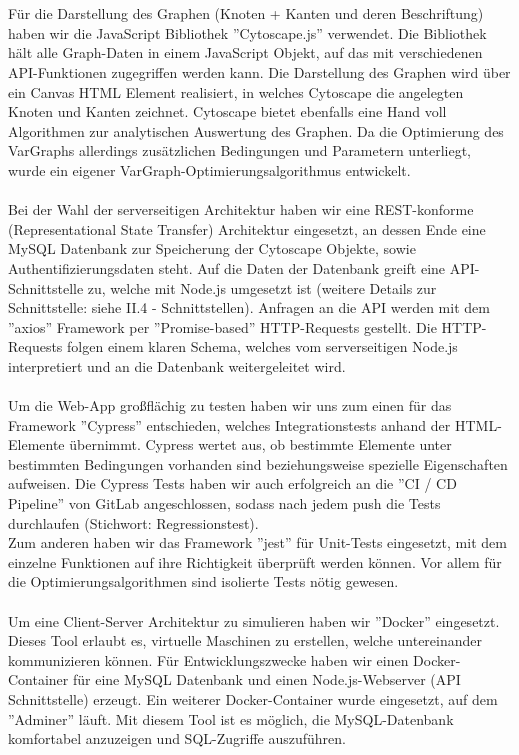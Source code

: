 \documentclass[twoside]{report}
\begin{document}
\\
\\Für die Darstellung des Graphen (Knoten + Kanten und deren Beschriftung) haben wir die JavaScript Bibliothek ''Cytoscape.js'' verwendet.
Die Bibliothek hält alle Graph-Daten in einem JavaScript Objekt, auf das mit verschiedenen API-Funktionen zugegriffen werden kann.
Die Darstellung des Graphen wird über ein Canvas HTML Element realisiert, in welches Cytoscape die angelegten Knoten und Kanten zeichnet.
Cytoscape bietet ebenfalls eine Hand voll Algorithmen zur analytischen Auswertung des Graphen. Da die Optimierung des VarGraphs
allerdings zusätzlichen Bedingungen und Parametern unterliegt, wurde ein eigener VarGraph-Optimierungsalgorithmus entwickelt.
\\
\\Bei der Wahl der serverseitigen Architektur haben wir eine REST-konforme (Representational State Transfer)
Architektur eingesetzt, an dessen Ende eine MySQL Datenbank zur Speicherung der Cytoscape Objekte, sowie Authentifizierungsdaten
steht. Auf die Daten der Datenbank greift eine API-Schnittstelle zu, welche mit Node.js umgesetzt ist (weitere Details zur Schnittstelle:
siehe II.4 - Schnittstellen). Anfragen an die API werden mit dem ''axios'' Framework per ''Promise-based'' HTTP-Requests gestellt. Die HTTP-Requests
folgen einem klaren Schema, welches vom serverseitigen Node.js interpretiert und an die Datenbank weitergeleitet wird.
\\
\\Um die Web-App großflächig zu testen haben wir uns zum einen für das Framework ''Cypress'' entschieden, welches Integrationstests anhand der
HTML-Elemente übernimmt. Cypress wertet aus, ob bestimmte Elemente unter bestimmten Bedingungen vorhanden sind beziehungsweise spezielle
Eigenschaften aufweisen. Die Cypress Tests haben wir auch erfolgreich an die ''CI / CD Pipeline'' von GitLab angeschlossen, sodass nach jedem
push die Tests durchlaufen (Stichwort: Regressionstest).
\\Zum anderen haben wir das Framework ''jest'' für Unit-Tests eingesetzt, mit dem einzelne Funktionen auf ihre Richtigkeit überprüft werden können. Vor allem
für die Optimierungsalgorithmen sind isolierte Tests nötig gewesen.
\\
\\Um eine Client-Server Architektur zu simulieren haben wir ''Docker'' eingesetzt. Dieses Tool erlaubt es, virtuelle Maschinen zu erstellen,
welche untereinander kommunizieren können. Für Entwicklungszwecke haben wir einen Docker-Container für eine MySQL Datenbank und
einen Node.js-Webserver (API Schnittstelle) erzeugt. Ein weiterer Docker-Container wurde eingesetzt, auf dem ''Adminer'' läuft. Mit diesem
Tool ist es möglich, die MySQL-Datenbank komfortabel anzuzeigen und SQL-Zugriffe auszuführen.
\end{document}
